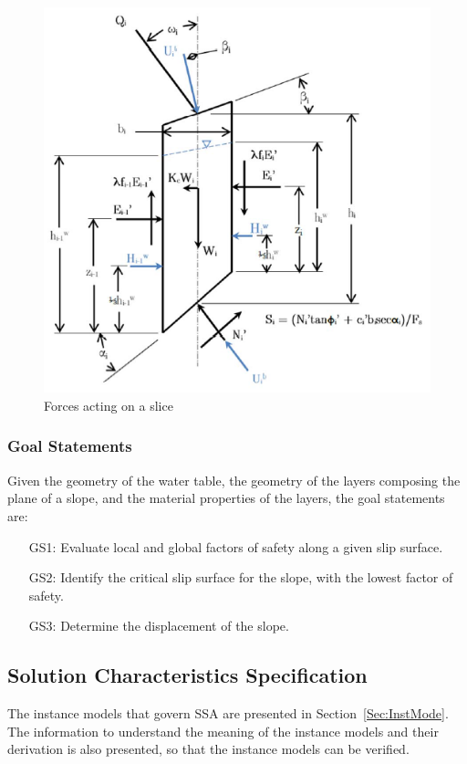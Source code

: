 \documentclass[12pt]{article}
\begin{document}
\begin{figure}
\begin{center}
\includegraphics{ForceDiagram.png}
\caption{Forces acting on a slice}
\label{Figure:Forcactionaslic}
\end{center}
\end{figure}
\subsubsection{Goal Statements}
\label{Sec:GoalStat}
Given the geometry of the water table, the geometry of the layers composing the plane of a slope, and the material properties of the layers, the goal statements are:
\begin{itemize}
\item[GS1:]Evaluate local and global factors of safety along a given slip surface.
\item[GS2:]Identify the critical slip surface for the slope, with the lowest factor of safety.
\item[GS3:]Determine the displacement of the slope.
\end{itemize}
\subsection{Solution Characteristics Specification}
\label{Sec:SoluCharSpec}
The instance models that govern SSA are presented in Section~\ref{Sec:InstMode}. The information to understand the meaning of the instance models and their derivation is also presented, so that the instance models can be verified.
\end{document}
